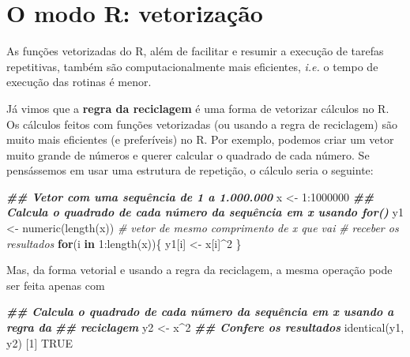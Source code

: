\documentclass[
  10pt,
  a4paper]{book}
\newenvironment{Shaded}{\begin{snugshade}}{\end{snugshade}}
\newcommand{\CommentTok}[1]{\textcolor[rgb]{0.56,0.35,0.01}{\textit{#1}}}
\newcommand{\ConstantTok}[1]{\textcolor[rgb]{0.00,0.00,0.00}{#1}}
\newcommand{\ControlFlowTok}[1]{\textcolor[rgb]{0.13,0.29,0.53}{\textbf{#1}}}
\newcommand{\DecValTok}[1]{\textcolor[rgb]{0.00,0.00,0.81}{#1}}
\newcommand{\DocumentationTok}[1]{\textcolor[rgb]{0.56,0.35,0.01}{\textbf{\textit{#1}}}}
\newcommand{\FunctionTok}[1]{\textcolor[rgb]{0.00,0.00,0.00}{#1}}
\newcommand{\NormalTok}[1]{#1}
\newcommand{\OtherTok}[1]{\textcolor[rgb]{0.56,0.35,0.01}{#1}}
\newcommand{\SpecialCharTok}[1]{\textcolor[rgb]{0.00,0.00,0.00}{#1}}
\begin{document}
\hypertarget{o-modo-r-vetorizauxe7uxe3o}{%
\section{O modo R: vetorização}\label{o-modo-r-vetorizauxe7uxe3o}}

As funções vetorizadas do R, além de facilitar e resumir a execução de
tarefas repetitivas, também são computacionalmente mais eficientes,
\emph{i.e.} o tempo de execução das rotinas é menor.

Já vimos que a \textbf{regra da reciclagem} é uma forma de vetorizar cálculos
no R. Os cálculos feitos com funções vetorizadas (ou usando a regra de
reciclagem) são muito mais eficientes (e preferíveis) no R. Por exemplo,
podemos criar um vetor muito grande de números e querer calcular o
quadrado de cada número. Se pensássemos em usar uma estrutura de
repetição, o cálculo seria o seguinte:

\begin{Shaded}
\begin{Highlighting}[]
\DocumentationTok{\#\# Vetor com uma sequência de 1 a 1.000.000}
\NormalTok{x }\OtherTok{\textless{}{-}} \DecValTok{1}\SpecialCharTok{:}\DecValTok{1000000}
\DocumentationTok{\#\# Calcula o quadrado de cada número da sequência em x usando for()}
\NormalTok{y1 }\OtherTok{\textless{}{-}} \FunctionTok{numeric}\NormalTok{(}\FunctionTok{length}\NormalTok{(x)) }\CommentTok{\# vetor de mesmo comprimento de x que vai}
                         \CommentTok{\# receber os resultados}
\ControlFlowTok{for}\NormalTok{(i }\ControlFlowTok{in} \DecValTok{1}\SpecialCharTok{:}\FunctionTok{length}\NormalTok{(x))\{}
\NormalTok{    y1[i] }\OtherTok{\textless{}{-}}\NormalTok{ x[i]}\SpecialCharTok{\^{}}\DecValTok{2}
\NormalTok{\}}
\end{Highlighting}
\end{Shaded}

Mas, da forma vetorial e usando a regra da reciclagem, a mesma operação
pode ser feita apenas com

\begin{Shaded}
\begin{Highlighting}[]
\DocumentationTok{\#\# Calcula o quadrado de cada número da sequência em x usando a regra da}
\DocumentationTok{\#\# reciclagem}
\NormalTok{y2 }\OtherTok{\textless{}{-}}\NormalTok{ x}\SpecialCharTok{\^{}}\DecValTok{2}
\DocumentationTok{\#\# Confere os resultados}
\FunctionTok{identical}\NormalTok{(y1, y2)}
\NormalTok{[}\DecValTok{1}\NormalTok{] }\ConstantTok{TRUE}
\end{Highlighting}
\end{Shaded}
\end{document}
